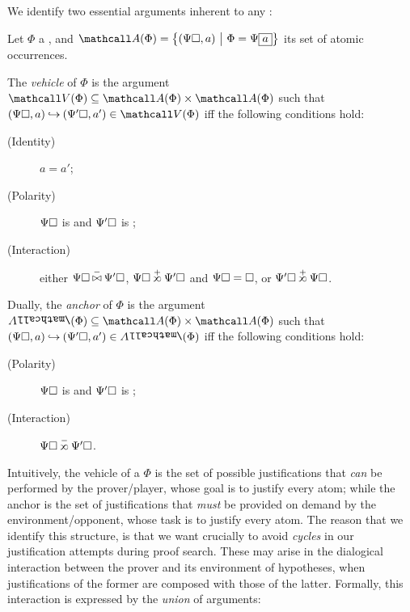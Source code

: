 \begin{scope}
We identify two essential arguments inherent to any :

\begin{definition} Let $\Phi$ a , and
  $\atomoccs{\Phi} = \compr{(\Psi\hole, a)}{\Phi = \Psi\select{a}}$ its set of
  atomic occurrences.
  
  The \emph{vehicle} of $\Phi$ is the argument $\vehicle{\Phi} \subseteq
  \atomoccs{\Phi} \times \atomoccs{\Phi}$ such that $(\Psi\hole, a) \justi
  (\Psi'\hole, a') \in \vehicle{\Phi}$ iff the following conditions hold:
  \begin{description}
    \item[(Identity)] $a = a'$;
    \item[(Polarity)] $\Psi\square$ is  and $\Psi'\square$ is
    ;
    \item[(Interaction)] either $\Psi\hole \cinterneg \Psi'\hole$,
    $\Psi\hole \sinterpos \Psi'\hole$ and $\Psi\square = \square$, or $\Psi'\hole
    \sinterpos \Psi\hole$.
  \end{description}

  Dually, the \emph{anchor} of $\Phi$ is the argument $\anchor{\Phi} \subseteq
  \atomoccs{\Phi} \times \atomoccs{\Phi}$ such that $(\Psi\hole, a) \justi
  (\Psi'\hole, a') \in \anchor{\Phi}$ iff the following conditions hold:
  \begin{description}
    \item[(Polarity)] $\Psi\square$ is  and $\Psi'\square$ is
    ;
    \item[(Interaction)] $\Psi\hole \sinterneg \Psi'\hole$.
  \end{description}
\end{definition}

Intuitively, the vehicle of a  $\Phi$ is the set of possible
justifications that \emph{can} be performed by the prover/player, whose goal is
to justify every  atom; while the anchor is the set of justifications
that \emph{must} be provided on demand by the environment/opponent, whose task
is to justify every  atom. The reason that we identify this structure,
is that we want crucially to avoid \emph{cycles} in our justification attempts
during proof search. These may arise in the dialogical interaction between the
prover and its environment of hypotheses, when justifications of the former are
composed with those of the latter. Formally, this interaction is expressed by
the \emph{union} of arguments:


\end{scope}
